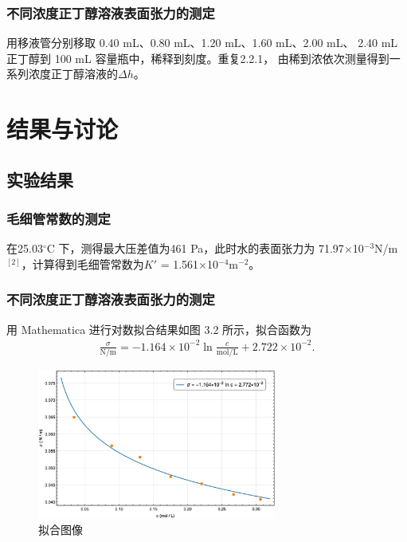 \documentclass[12pt]{ctexart}
\numberwithin{equation}{section}
\begin{document}
\subsubsection{不同浓度正丁醇溶液表面张力的测定}

用移液管分别移取 0.40 mL、0.80 mL、1.20 mL、1.60 mL、2.00 mL、
2.40 mL正丁醇到 100 mL 容量瓶中，稀释到刻度。重复2.2.1，
由稀到浓依次测量得到一系列浓度正丁醇溶液的$\Delta h$。

\section{结果与讨论}
\subsection{实验结果}
\subsubsection{毛细管常数的测定}

在25.03$^\circ$C 下，测得最大压差值为461 Pa，此时水的表面张力为
71.97$\times$10$^{-3}$N/m$^{[2]}$，计算得到毛细管常数为$K'$ =
1.561$\times$10$^{-4}$m$^{-2}$。

\subsubsection{不同浓度正丁醇溶液表面张力的测定}

用 Mathematica 进行对数拟合结果如图 3.2 所示，拟合函数为
\begin{align}
    \frac{\sigma}{\mathrm{N/m}} = -1.164\times 10^{-2}
    \ln \frac{c}{\mathrm{mol/L}} + 2.722\times 10^{-2}.
\end{align}

\begin{figure}[ht]
    \centering
    \includegraphics[width=0.7\textwidth]{fitting.jpeg}
    \caption{拟合图像}
\end{figure}
\end{document}
